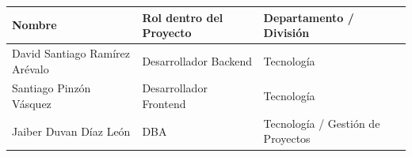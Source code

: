 \documentclass[12pt, a4paper]{article}
\begin{document}
\begin{tabularx}{\textwidth}{@{} X l X @{}}
    \toprule
    \textbf{Nombre} & \textbf{Rol dentro del Proyecto} & \textbf{Departamento / División} \\
    \midrule
    David Santiago Ramírez Arévalo & Desarrollador Backend  & Tecnología \\
    Santiago Pinzón Vásquez        & Desarrollador Frontend & Tecnología \\
    Jaiber Duvan Díaz León         & DBA                    & Tecnología / Gestión de Proyectos \\
    \bottomrule
\end{tabularx}
 
\end{document}

